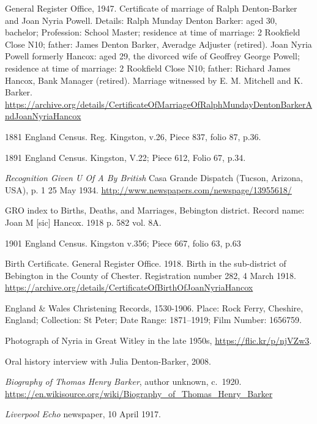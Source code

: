 \begin{thebibliography}{99}
	General Register Office, 1947. Certificate of marriage of Ralph Denton-Barker and Joan Nyria Powell.
	Details: Ralph Munday Denton Barker: aged 30, bachelor; Profession: School Master;
	residence at time of marriage: 2 Rookfield Close N10; father: James Denton Barker, Averadge Adjuster (retired).
	Joan Nyria Powell formerly Hancox: aged 29, the divorced wife of Geoffrey George Powell;
	residence at time of marriage: 2 Rookfield Close N10; father: Richard James Hancox, Bank Manager (retired).
	Marriage witnessed by E. M. Mitchell and K. Barker.
	\url{https://archive.org/details/CertificateOfMarriageOfRalphMundayDentonBarkerAndJoanNyriaHancox}

	1881 England Census. Reg. Kingston, v.26, Piece 837, folio 87, p.36.

	1891 England Census. Kingston, V.22; Piece 612, Folio 67, p.34.

	\emph{Recognition Given U Of A By British}
	Casa Grande Dispatch (Tucson, Arizona, USA), p. 1 25 May 1934. \url{http://www.newspapers.com/newspage/13955618/}

	GRO index to Births, Deaths, and Marriages,
	Bebington district. Record name: Joan M [sic] Hancox.
	1918 p. 582 vol. 8A.

	1901 England Census. Kingston v.356; Piece 667, folio 63, p.63

	Birth Certificate. General Register Office.
	1918. Birth in the sub-district of Bebington in the County of Chester.
	Registration number 282, 4 March 1918.
	\url{https://archive.org/details/CertificateOfBirthOfJoanNyriaHancox}

	England \& Wales Christening Records, 1530-1906.
	Place: Rock Ferry, Cheshire, England; Collection: St Peter;
	Date Range: 1871--1919; Film Number: 1656759.

	Photograph of Nyria in Great Witley in the late 1950s,
	\url{https://flic.kr/p/njVZw3}.

	Oral history interview with Julia Denton-Barker, 2008.

	\emph{Biography of Thomas Henry Barker}, author unknown, c.\ 1920.
	\url{https://en.wikisource.org/wiki/Biography_of_Thomas_Henry_Barker}

	\emph{Liverpool Echo} newspaper, 10 April 1917.


\end{thebibliography}
